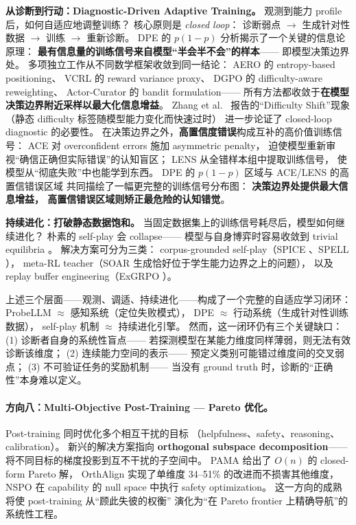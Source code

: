 \noindent
\textbf{从诊断到行动：Diagnostic-Driven Adaptive Training。}
观测到能力 profile 后，如何自适应地调整训练？
核心原则是 \textit{closed loop}：
诊断弱点 $\rightarrow$ 生成针对性数据 $\rightarrow$ 训练 $\rightarrow$ 重新诊断。
DPE \cite{jia2026dpe} 的 $p(1-p)$ 分析揭示了一个关键的信息论原理：
\textbf{最有信息量的训练信号来自模型``半会半不会''的样本}——
即模型决策边界处。
多项独立工作从不同数学框架收敛到同一结论：
AERO \cite{gao2026aero} 的 entropy-based positioning、
VCRL \cite{jiang2025vcrl} 的 reward variance proxy、
DGPO \cite{dai2026dgpo} 的 difficulty-aware reweighting、
Actor-Curator \cite{gu2026actorcurator} 的 bandit formulation——
所有方法都收敛于\textbf{在模型决策边界附近采样以最大化信息增益}。
Zhang et al.\ \cite{zhang2025adcl} 报告的``Difficulty Shift''现象
（静态 difficulty 标签随模型能力变化而快速过时）
进一步论证了 closed-loop diagnostic 的必要性。
在决策边界之外，\textbf{高置信度错误}构成互补的高价值训练信号：
ACE \cite{ace2026} 对 overconfident errors 施加 asymmetric penalty，
迫使模型重新审视``确信正确但实际错误''的认知盲区；
LENS \cite{feng2025lens} 从全错样本组中提取训练信号，
使模型从``彻底失败''中也能学到东西。
DPE 的 $p(1-p)$ 区域与 ACE/LENS 的高置信错误区域
共同描绘了一幅更完整的训练信号分布图：
\textbf{决策边界处提供最大信息增益，
高置信错误区域则矫正最危险的认知错觉}。

\noindent
\textbf{持续进化：打破静态数据饱和。}
当固定数据集上的训练信号耗尽后，模型如何继续进化？
朴素的 self-play 会 collapse——
模型与自身博弈时容易收敛到 trivial equilibria
\cite{liu2026selfplayinfo,sheikh2025srt,yi2025collapse}。
解决方案可分为三类：
corpus-grounded self-play（SPICE \cite{liu2025spice}、SPELL \cite{yang2025spell}），
meta-RL teacher（SOAR \cite{sundaram2026soar} 生成恰好位于学生能力边界之上的问题），
以及 replay buffer engineering（ExGRPO \cite{zhan2025exgrpo}）。

\noindent
上述三个层面——观测、调适、持续进化——构成了一个完整的自适应学习闭环：
ProbeLLM $\approx$ 感知系统（定位失败模式），
DPE $\approx$ 行动系统（生成针对性训练数据），
self-play 机制 $\approx$ 持续进化引擎。
然而，这一闭环仍有三个关键缺口：
(1) 诊断者自身的系统性盲点——
若探测模型在某能力维度同样薄弱，则无法有效诊断该维度；
(2) 连续能力空间的表示——
预定义类别可能错过维度间的交叉弱点；
(3) 不可验证任务的奖励机制——
当没有 ground truth 时，诊断的``正确性''本身难以定义。

\paragraph{方向八：Multi-Objective Post-Training --- Pareto 优化。}
Post-training 同时优化多个相互干扰的目标
（helpfulness、safety、reasoning、calibration）。
新兴的解决方案指向 \textbf{orthogonal subspace decomposition}——
将不同目标的梯度投影到互不干扰的子空间中。
PAMA \cite{he2025pama} 给出了 $O(n)$ 的 closed-form Pareto 解，
OrthAlign \cite{orthalign2025} 实现了单维度 34--51\% 的改进而不损害其他维度，
NSPO \cite{nspo2025} 在 capability 的 null space 中执行 safety optimization。
这一方向的成熟将使 post-training 从``顾此失彼的权衡''
演化为``在 Pareto frontier 上精确导航''的系统性工程。


